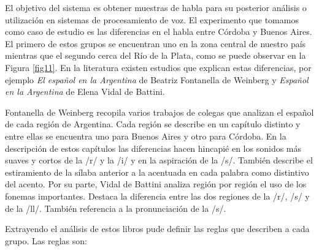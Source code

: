 El objetivo del sistema es obtener muestras de habla para su posterior análisis o utilización en sistemas de procesamiento de voz. El experimento que tomamos como caso de estudio es las diferencias en el habla entre Córdoba y Buenos Aires. El primero de estos grupos se encuentran uno en la zona central de nuestro país mientras que el segundo cerca del Río de la Plata, como se puede observar en la Figura \ref{fig11}. En la literatura existen estudios que explican estas diferencias, por ejemplo \textit{El español en la Argentina} \cite{Fontanella2000} de Beatriz Fontanella de Weinberg y \textit{Español en la Argentina} \cite{Vidal1964} de Elena Vidal de Battini. 

Fontanella de Weinberg recopila varios trabajos de colegas que analizan el español de cada región de Argentina. Cada región se describe en un capítulo distinto y entre ellas se encuentra uno para Buenos Aires y otro para Córdoba. En la descripción de estos capítulos las diferencias hacen hincapié en los sonidos más suaves y cortos de la /r/ y la /i/ y en la aspiración de la /s/. También describe el estiramiento de la sílaba anterior a la acentuada en cada palabra como distintivo del acento. Por su parte, Vidal de Battini analiza región por región el uso de los fonemas importantes. Destaca la diferencia entre las dos regiones de la /r/, /s/ y de la /ll/. También referencia a la pronunciación de la /s/.

Extrayendo el análisis de estos libros pude definir las reglas que describen a cada grupo. Las reglas son: 

